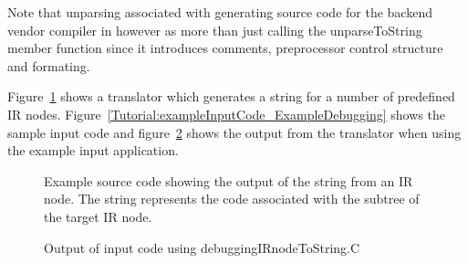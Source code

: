 Note that unparsing associated with generating source code for the backend 
vendor compiler in however as more than just calling the unparseToString
member function since it introduces comments, preprocessor control structure 
and formating.
    
Figure~\ref{Tutorial:exampleDebuggingIRNodeToString} shows a translator
which generates a string for a number of predefined IR nodes.  
Figure~\ref{Tutorial:exampleInputCode_ExampleDebugging} 
shows the sample input code and 
figure~\ref{Tutorial:exampleOutput_DebuggingIRNodeToString} 
shows the output from the translator when using the example input application.


\begin{figure}[!h]
{\indent
{\mySmallFontSize

\begin{latexonly}
   
\end{latexonly}

\begin{htmlonly}
   
\end{htmlonly}

}
}
\caption{Example source code showing the output of the string from an IR node. The string
         represents the code associated with the subtree of the target IR node.}
\label{Tutorial:exampleDebuggingIRNodeToString}
\end{figure}

\begin{figure}[!h]
{\indent
{\mySmallFontSize

\begin{latexonly}
   
\end{latexonly}

\begin{htmlonly}
   
\end{htmlonly}

}
}
\caption{Output of input code using debuggingIRnodeToString.C}
\label{Tutorial:exampleOutput_DebuggingIRNodeToString}
\end{figure}




